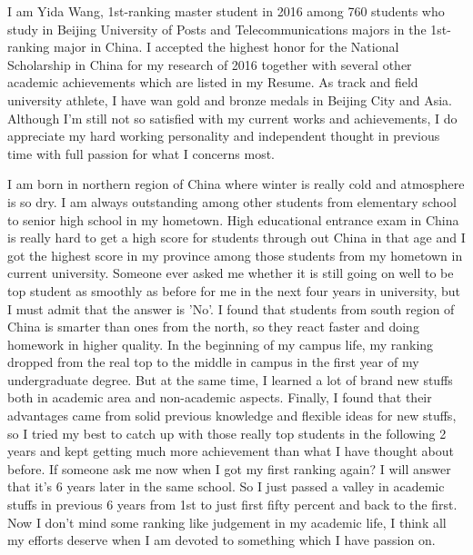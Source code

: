 \documentclass[11pt, a4paper]{awesome-cv} %
\begin{document}
\makecvheader %



I am Yida Wang, 1st-ranking master student in 2016 among 760 students who study in Beijing University of Posts and Telecommunications majors in the 1st-ranking major in China. I accepted the highest honor for the National Scholarship in China for my research of 2016 together with several other academic achievements which are listed in my Resume. As track and field university athlete, I have wan gold and bronze medals in Beijing City and Asia. Although I'm still not so satisfied with my current works and achievements, I do appreciate my hard working personality and independent thought in previous time with full passion for what I concerns most.


I am born in northern region of China where winter is really cold and atmosphere is so dry. I am always outstanding among other students from elementary school to senior high school in my hometown. High educational entrance exam in China is really hard to get a high score for students through out China in that age and I got the highest score in my province among those students from my hometown in current university. Someone ever asked me whether it is still going on well to be top student as smoothly as before for me in the next four years in university, but I must admit that the answer is 'No'. I found that students from south region of China is smarter than ones from the north, so they react faster and doing homework in higher quality. In the beginning of my campus life, my ranking dropped from the real top to the middle in campus in the first year of my undergraduate degree. But at the same time, I learned a lot of brand new stuffs both in academic area and non-academic aspects. Finally, I found that their advantages came from solid previous knowledge and flexible ideas for new stuffs, so I tried my best to catch up with those really top students in the following 2 years and kept getting much more achievement than what I have thought about before. If someone ask me now when I got my first ranking again? I will answer that it's 6 years later in the same school. So I just passed a valley in academic stuffs in previous 6 years from 1st to just first fifty percent and back to the first. Now I don't mind some ranking like judgement in my academic life, I think all my efforts deserve when I am devoted to something which I have passion on.
\end{document}
